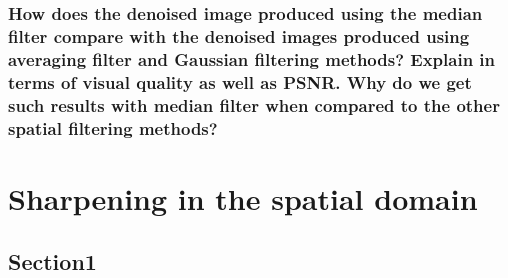 \documentclass[article, 1.5space, letterpaper, 12pt, oneside, header, footer]{SydeClass}
\begin{document}
\subsubsection{How does the denoised image produced using the median filter compare with the denoised images
produced using averaging filter and Gaussian filtering methods? Explain in terms of visual quality
as well as PSNR. Why do we get such results with median filter when compared to the other spatial
filtering methods?}



\section{Sharpening in the spatial domain}

\subsection{Section1}
\begin{figure}[ht]
\centering
\end{figure}
\end{document}
